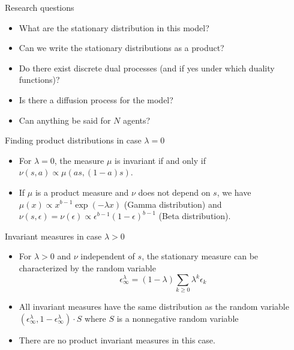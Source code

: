 \documentclass[9pt]{beamer}
\begin{document}
\begin{frame}{Research questions}
\begin{itemize}
\item What are the stationary distribution in this model?
\item Can we write the stationary distributions as a product?
\item Do there exist discrete dual processes (and if yes under which duality functions)?
\item Is there a diffusion process for the model?
\item Can anything be said for $N$ agents?
\end{itemize}
\end{frame}



\begin{frame}{Finding product distributions in case $\lambda = 0$}
\begin{theorem}
\begin{itemize}
    \item For $\lambda = 0$, the measure $\mu$ is invariant if and only if $\nu(s, a) \propto \mu(as, (1-a)s)$.
    \item If $\mu$ is a product measure and $\nu$ does not depend on $s$, we have $\mu(x) \propto x^{b-1} \exp(-\lambda x)$ (Gamma distribution) and $\nu(s, \epsilon) = \nu(\epsilon) \propto \epsilon^{b-1}(1-\epsilon)^{b-1}$ (Beta distribution).
\end{itemize}
\end{theorem}
\end{frame}




\begin{frame}{Invariant measures in case $\lambda > 0$}
\begin{theorem}
\begin{itemize}
    \item For $\lambda > 0$ and $\nu$ independent of $s$, the stationary measure can be characterized by the random variable
        \[
            \epsilon_{\infty}^{\lambda} = (1-\lambda)\sum_{k \ge 0} \lambda^k \epsilon_k
        \]
    \item All invariant measures have the same distribution as the random variable $(\epsilon_{\infty}^{\lambda}, 1 - \epsilon_{\infty}^{\lambda}) \cdot S$ where $S$ is a nonnegative random variable
    \item There are no product invariant measures in this case.
\end{itemize}
\end{theorem}
\end{frame}
\end{document}
